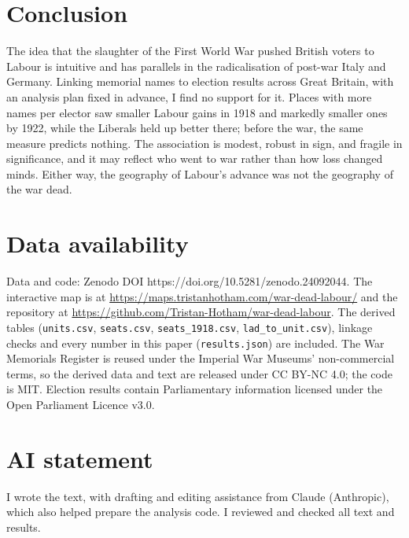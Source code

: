 \documentclass[11pt,a4paper]{article}
\begin{document}
\section{Conclusion}
The idea that the slaughter of the First World War pushed British voters to Labour is intuitive and has parallels in the radicalisation of post-war Italy and Germany. Linking memorial names to election results across Great Britain, with an analysis plan fixed in advance, I find no support for it. Places with more names per elector saw smaller Labour gains in 1918 and markedly smaller ones by 1922, while the Liberals held up better there; before the war, the same measure predicts nothing. The association is modest, robust in sign, and fragile in significance, and it may reflect who went to war rather than how loss changed minds. Either way, the geography of Labour's advance was not the geography of the war dead.

\section*{Data availability}
Data and code: Zenodo DOI https://doi.org/10.5281/zenodo.24092044. The interactive map is at \url{https://maps.tristanhotham.com/war-dead-labour/} and the repository at \url{https://github.com/Tristan-Hotham/war-dead-labour}. The derived tables (\texttt{units.csv}, \texttt{seats.csv}, \texttt{seats\_1918.csv}, \texttt{lad\_to\_unit.csv}), linkage checks and every number in this paper (\texttt{results.json}) are included. The War Memorials Register is reused under the Imperial War Museums' non-commercial terms, so the derived data and text are released under CC BY-NC 4.0; the code is MIT. Election results contain Parliamentary information licensed under the Open Parliament Licence v3.0.

\section*{AI statement}
I wrote the text, with drafting and editing assistance from Claude (Anthropic), which also helped prepare the analysis code. I reviewed and checked all text and results.
\end{document}
